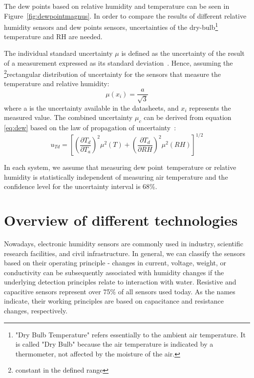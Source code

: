 The dew points based on relative humidity and temperature can be seen in Figure~\ref{fig:dewpointmagnus}. In order to compare the results of different relative humidity sensors and dew points sensors, uncertainties of the dry-bulb\footnote{"Dry Bulb Temperature" refers essentially to the ambient air temperature. It is called "Dry Bulb" because the air temperature is indicated by a thermometer, not affected by the moisture of the air.} temperature and \gls{RH} are needed.

The individual standard uncertainty $\mu$ is defined as the uncertainty of the result of a measurement expressed as its standard deviation~\cite{NIST_1994}. Hence, assuming the \footnote{constant in the defined range}{rectangular} distribution of uncertainty for the sensors that measure the temperature and relative humidity:
\begin{equation}
    \mu(x_{i}) = \frac{a}{\sqrt{3}}
\end{equation}
where a is the uncertainty available in the datasheets, and $x_{i}$ represents the measured value. The combined uncertainty $\mu_{c}$ can be derived from equation \ref{eq:dew} based on the law of propagation of uncertainty~\cite{dp_uncertainty}:
\begin{equation}
    u_{Td} = \left [  \left (\frac{\partial T_{d}}{\partial T_{a}}  \right )^{2} \mu^{2}(T) + \left (\frac{\partial T_{d}}{\partial RH}  \right )^{2} \mu^{2}(RH)\right ]^{1/2}
    \label{dp_error}
\end{equation}

In each system, we assume that measuring dew point temperature or relative humidity is statistically independent of measuring air temperature and the confidence level for the uncertainty interval is 68\%.  

\section{Overview of different technologies}

Nowadays, electronic humidity sensors are commonly used in industry, scientific research facilities, and civil infrastructure. In general, we can classify the sensors based on their operating principle - changes in current, voltage, weight, or conductivity can be subsequently associated with humidity changes if the underlying detection principles relate to interaction with water. Resistive and capacitive sensors represent over 75\% of all sensors used today. As the names indicate, their working principles are based on capacitance and resistance changes, respectively.


